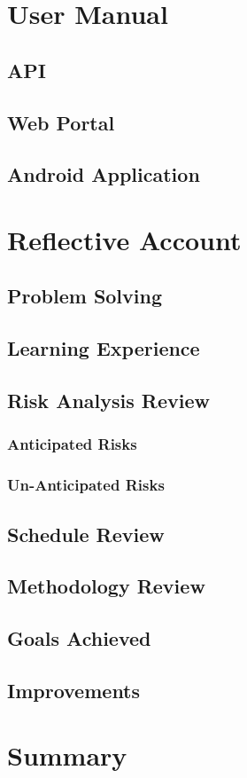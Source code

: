 \documentclass[11pt,a4paper]{report}
\begin{document}
\chapter{User Manual}
\label{sec:user-manual}

\section{API}

\section{Web Portal}

\section{Android Application}

\chapter{Reflective Account}
\label{sec:reflective-account}
\section{Problem Solving}
\label{sec:problem-solving}
\section{Learning Experience}
\label{sec:learning-experience}
\section{Risk Analysis Review}
\label{sec:risk-analysis-review}
\subsection{Anticipated Risks}
\label{sec:anticipated-risks}
\subsection{Un-Anticipated Risks}
\label{sec:unanticipated-risks}
\section{Schedule Review}
\label{sec:schedule-review}
\section{Methodology Review}
\label{sec:methodology-review}
\section{Goals Achieved}
\label{sec:goals-achieved}
\section{Improvements}
\label{sec:improvements}

\chapter*{Summary}
\label{sec:summary}

\newpage



\appendix
\end{document}

